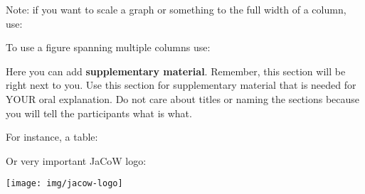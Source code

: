 \documentclass[a0paper,fleqn]{betterposter}
\newcommand{\fontsizecaption}{\fontsize{32.00}{45.33} \selectfont}
\begin{document}
{\vspace*{3.0em}

Note: if you want to scale a graph or something to the full width of a column, use:

\vspace*{1.0em}


To use a figure spanning multiple columns use:


}{

Here you can add \textbf{supplementary material}. Remember, this section will be
right next to you.
Use this section for supplementary material that is needed for YOUR oral
explanation. Do not care about titles or naming the sections because you will
tell the participants what is what.

\vspace*{1.0em}

For instance, a table:


\vspace*{1.0em}

Or very important JaCoW logo:
\begin{center}
\texttt{[image: img/jacow-logo]}
\end{center}

}
\end{document}
